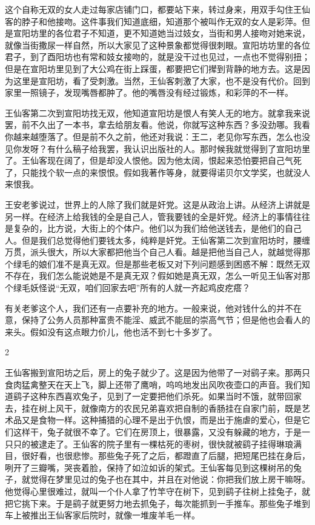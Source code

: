 这个自称无双的女人走过每家店铺门口，都要站下来，转过身来，用双手勾住王仙客的脖子和他接吻。这件事我们知道底细，知道那个被叫作无双的女人是彩萍。但是宣阳坊里的各位君子不知道，更不知道她当过妓女，当街和男人接吻对她来说，就像当街撒尿一样自然，所以大家见了这种景象都觉得很刺眼。宣阳坊坊里的各位君子，到了酉阳坊也有常和妓女接吻的，就是没干过也见过，一点也不觉得别扭；但是在宣阳坊里见到了大公鸡在街上踩蛋，都要把它们撵到背静的地方去。这是因为这里是宣阳坊，看了受刺激。当然，王仙客刺激了大家，也不是没有代价。回到家里一照镜子，发现嘴唇都肿了。他的嘴唇没有经过锻炼，和彩萍的不一样。 

王仙客第二次到宣阳坊找无双，他知道宣阳坊是恨人有笑人无的地方。就拿我来说罢，前不久出了一本书，拿去给朋友看。他说，你就写这种东西？多没劲哪。我看你越来越堕落了。但是前不久之前，他还对我说：王二，老见你写东西，怎么也没见你发呀？有什么稿子给我罢，我认识出版社的人。那时候我就觉得到了宣阳坊里了。王仙客现在阔了，但是却没人恨他。因为他太阔，恨起来恐怕要把自己气死了，只能找个软一点的来恨恨。假如我著作等身，就要得诺贝尔文学奖，也就没人来恨我。 

王安老爹说过，世界上的人除了我们就是奸党。这是从政治上讲。从经济上讲就是另一样。在经济上给我钱的全是自己人，管我要钱的全是奸党。经济上的事情往往是复杂的，比方说，大街上的个体户。他们以为我们给他送钱去，是他们的自己人。但是我们总觉得他们要钱太多，纯粹是奸党。王仙客第二次到宣阳坊时，腰缠万贯，派头很大，所以大家都把他当个自己人看。越是把他当自己人，就越觉得那个绿毛的娘们准不是真无双。但是那些老板又对下列问题感到困惑不解：既然无双不存在，我们怎么能说她是不是真无双？假如她是真无双，怎么一听见王仙客对那个绿毛妖怪说“无双，咱们回家去吧”所有的人就一齐起鸡皮疙瘩？ 

有关老爹这个人，我们还有一点要补充的地方。一般来说，他对钱什么的并不在意，保持了公务人员那种富贵不能淫、威武不能屈的崇高气节；但是他也会看人的来头。假如没有这点眼力价儿，他也活不到七十多岁了。 

2 

王仙客搬到宣阳坊之后，房上的兔子就少了。这是因为他带了一对鹞子来。那两只食肉猛禽整天在天上飞，脚上还带了鹰哨，呜呜地发出风吹夜壶口的声音。我们知道鹞子这种东西喜欢兔子，见到了一定要把他们杀死。如果当时不饿，就带回家去，挂在树上风干，就像南方的农民兄弟喜欢把自制的香肠挂在自家门前，既是艺术品又是食物一样。这种捕猎的心理不是出于仇恨，而是出于施虐的爱心，但是它们这样干，兔子就很不幸了。它们在房顶上，很暴露，又没有躲藏的地方，于是一只只的被逮走了。王仙客的院子里有一棵枯死的枣树，很快就被鹞子挂得琳琅满目，很好看，也很悲惨。那些兔子死了之后，都蹬直了后腿，把短尾巴挂在身后，咧开了三瓣嘴，哭丧着脸，保持了如泣如诉的架式。王仙客每见到这棵树吊的兔子，就觉得在梦里见过的兔子也在其中，并且在对他说：你把我们放上房干嘛呀。他觉得心里很难过，就叫一个仆人拿了竹竿守在树下，见到鹞子往树上挂兔子，就把它挑下来。于是鹞子就更努力地去抓兔子，每次能抓到一手推车。那些兔子堆到车上被推出王仙客家后院时，就像一堆废羊毛一样。 

